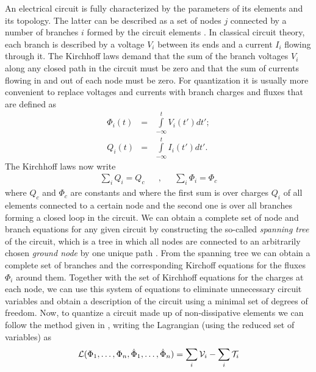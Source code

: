An electrical circuit is fully characterized by the parameters of its elements and its topology. The latter can be described as a set of nodes $j$ connected by a number of branches $i$ formed by the circuit elements . In classical circuit theory, each branch is described by a voltage $V_i$ between its ends and a current $I_{i}$ flowing through it. The Kirchhoff laws demand that the sum of the branch voltages $V_i$ along any closed path in the circuit must be zero and that the sum of currents flowing in and out of each node must be zero. For quantization it is usually more convenient to replace voltages and currents with branch charges and fluxes that are defined as
%
\begin{eqnarray}
\Phi_i(t) & = & \int\limits_{-\infty}^t V_i(t') dt' ;\\
Q_i(t) & = & \int\limits_{-\infty}^t I_i(t') dt'.
\end{eqnarray}
%
The Kirchhoff laws now write
%
\begin{align}
\sum\limits_{i} Q_i  =  Q_c & & , & & \sum\limits_{i}\Phi_i = \Phi_c \label{eq:kirchhoff_charge}
\end{align}
%
where $Q_c$ and $\Phi_c$ are constants and where the first sum is over charges $Q_i$ of all elements connected to a certain node and the second one is over all branches forming a closed loop in the circuit. We can obtain a complete set of node and branch equations for any given circuit by constructing the so-called {\it spanning tree} of the circuit, which is a tree in which all nodes are connected to an arbitrarily chosen {\it ground node} by one unique path \citep{devoret_quantum_1995}. From the spanning tree we can obtain a complete set of branches and the corresponding Kirchoff equations for the fluxes $\Phi_i$ around them. Together with the set of Kirchhoff equations for the charges at each node, we can use this system of equations to eliminate unnecessary circuit variables and obtain a description of the circuit using a minimal set of degrees of freedom. Now, to quantize a circuit made up of non-dissipative elements we can follow the method given in \cite{yurke_quantum_1984}, writing the Lagrangian (using the reduced set of variables) as 
%
\begin{equation}
\begin{mathcal}L\end{mathcal}(\Phi_1,\hdots,\Phi_n,\dot{\Phi}_1,\hdots,\dot{\Phi}_n) = \sum\limits_i \begin{mathcal}V\end{mathcal}_i - \sum\limits_i \begin{mathcal}T\end{mathcal}_i \label{eq:circuit_lagrangian}
\end{equation}
